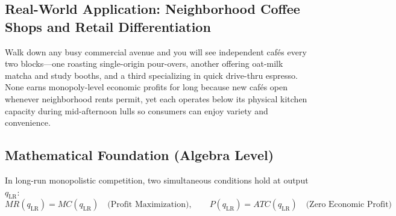 \documentclass[11pt,letterpaper]{article}
\begin{document}
\subsection*{Real-World Application: Neighborhood Coffee Shops and Retail Differentiation}
Walk down any busy commercial avenue and you will see independent cafés every two blocks—one roasting single-origin pour-overs, another offering oat-milk matcha and study booths, and a third specializing in quick drive-thru espresso. None earns monopoly-level economic profits for long because new cafés open whenever neighborhood rents permit, yet each operates below its physical kitchen capacity during mid-afternoon lulls so consumers can enjoy variety and convenience.

\subsection*{Mathematical Foundation (Algebra Level)}
In long-run monopolistic competition, two simultaneous conditions hold at output $q_{\text{LR}}$:
\begin{equation}
MR(q_{\text{LR}}) = MC(q_{\text{LR}}) \quad \text{(Profit Maximization)}, \qquad P(q_{\text{LR}}) = ATC(q_{\text{LR}}) \quad \text{(Zero Economic Profit)}
\end{equation}
\end{document}
